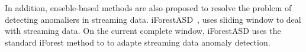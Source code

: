 In addition,
enseble-based methods are also proposed to
resolve the problem of detecting anomaliers
in streaming data.
iForestASD~\cite{ding2013anomaly},
uses sliding window to deal with streaming
data.
On the current complete window,
iForestASD uses the standard
iForest method to to adapte streaming
data anomaly detection.


